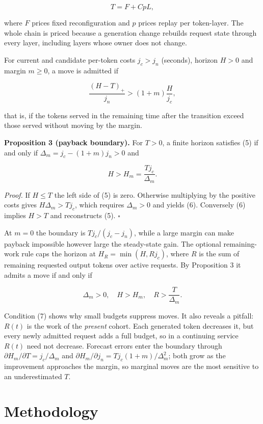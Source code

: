 \documentclass[preprint,12pt]{elsarticle}
\begin{document}
\[T=F+CpL, \tag{4}\]

where \(F\) prices fixed reconfiguration and \(p\) prices replay per
token-layer. The whole chain is priced because a generation change
rebuilds request state through every layer, including layers whose owner
does not change.

For current and candidate per-token costs \(j_c>j_n\) (seconds), horizon
\(H>0\) and margin \(m\ge0\), a move is admitted if

\[\frac{(H-T)_+}{j_n}>(1+m)\frac{H}{j_c}, \tag{5}\]

that is, if the tokens served in the remaining time after the transition
exceed those served without moving by the margin.

\textbf{Proposition 3 (payback boundary).} For \(T>0\), a finite horizon
satisfies (5) if and only if \(\Delta_m=j_c-(1+m)j_n>0\) and

\[H>H_m=\frac{Tj_c}{\Delta_m}. \tag{6}\]

\emph{Proof.} If \(H\le T\) the left side of (5) is zero. Otherwise
multiplying by the positive costs gives \(H\Delta_m>Tj_c\), which
requires \(\Delta_m>0\) and yields (6). Conversely (6) implies \(H>T\)
and reconstructs (5). \(\square\)

At \(m=0\) the boundary is \(Tj_c/(j_c-j_n)\), while a large margin can
make payback impossible however large the steady-state gain. The
optional remaining-work rule caps the horizon at \(H_R=\min(H,Rj_c)\),
where \(R\) is the sum of remaining requested output tokens over active
requests. By Proposition 3 it admits a move if and only if

\[\Delta_m>0,\quad H>H_m,\quad R>\frac{T}{\Delta_m}. \tag{7}\]

Condition (7) shows why small budgets suppress moves. It also reveals a
pitfall: \(R(t)\) is the work of the \emph{present} cohort. Each
generated token decreases it, but every newly admitted request adds a
full budget, so in a continuing service \(R(t)\) need not decrease.
Forecast errors enter the boundary through
\(\partial H_m/\partial T=j_c/\Delta_m\) and
\(\partial H_m/\partial j_n=Tj_c(1+m)/\Delta_m^2\); both grow as the
improvement approaches the margin, so marginal moves are the most
sensitive to an underestimated \(T\).

\hypertarget{methodology}{%
\section{Methodology}\label{methodology}}
\end{document}
